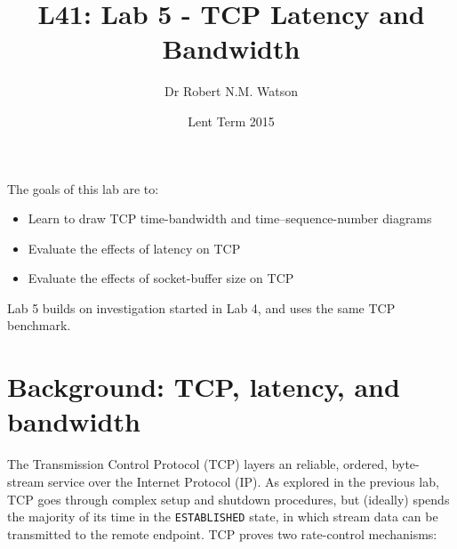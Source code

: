 \documentclass[a4paper,10pt]{article}
\begin{document}
\title{L41: Lab 5 - TCP Latency and Bandwidth}
\author{Dr Robert N.M. Watson}
\date{Lent Term 2015}
\maketitle

\noindent
The goals of this lab are to:

\begin{itemize}
\item Learn to draw TCP time-bandwidth and time--sequence-number diagrams
\item Evaluate the effects of latency on TCP
\item Evaluate the effects of socket-buffer size on TCP
\end{itemize}

\noindent
Lab 5 builds on investigation started in Lab 4, and uses the same TCP
benchmark.

\section*{Background: TCP, latency, and bandwidth}

The Transmission Control Protocol (TCP) layers an reliable, ordered,
byte-stream service over the Internet Protocol (IP).
As explored in the previous lab, TCP goes through complex setup and shutdown
procedures, but (ideally) spends the majority of its time in the
\texttt{ESTABLISHED} state, in which stream data can be transmitted to the
remote endpoint.
TCP proves two rate-control mechanisms:
\end{document}
